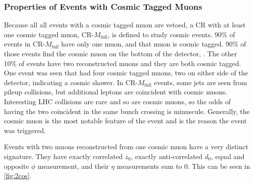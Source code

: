 \subsubsection{Properties of Events with Cosmic Tagged Muons}
Because all all events with a cosmic tagged muon are vetoed, a \ac{CR} with at least one cosmic tagged muon, CR-$M_{\textrm{full}}$, is defined to study cosmic events. 90\% of events in CR-$M_{\textrm{full}}$ have only one muon, and that muon is cosmic tagged. 90\% of those events find the cosmic muon on the bottom of the detector, \mb. The other 10\% of events have two reconstructed muons and they are both cosmic tagged. One event was seen that had four cosmic tagged muons, two on either side of the detector, indicating a cosmic shower. In CR-$M_{\textrm{full}}$ events, some jets are seen from pileup collisions, but additional leptons are coincident with cosmic muons. Interesting \ac{LHC} collisions are rare and so are cosmic muons, so the odds of having the two coincident in the same bunch crossing is minuscule. Generally, the cosmic muon is the most notable feature of the event and is the reason the event was triggered.

Events with two muons reconstructed from one cosmic muon have a very distinct signature. They have exactly correlated $z_{0}$, exactly anti-correlated $d_{0}$, equal and opposite $\phi$ measurement, and their $\eta$ measurements sum to 0. This can be seen in \autoref{fig:2cos}.


